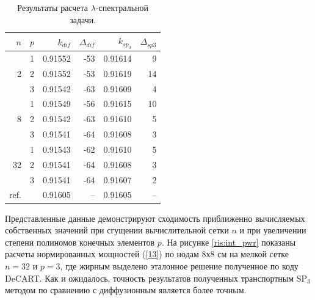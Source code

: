 \documentclass{crm-article}
\begin{document}
\begin{table}[h]
\caption{Результаты расчета $\lambda$-спектральной задачи.}
\label{table:t2-lamda}
\begin{center}
\begin{tabular}{r r r r r r}
\hline
$n$ & $p$ & $k_{dif}$ & $\Delta_{dif}$ & $k_{sp_3}$ & $\Delta_{sp3}$\\
\hline
	& 1	& 0.91552 & -53& 0.91614 & 9 \\
2	& 2	& 0.91552 & -53& 0.91619 &14 \\
	& 3	& 0.91542 & -63& 0.91609 & 4 \\ 
\hline
	& 1	& 0.91549 & -56& 0.91615 & 10\\
8& 2	& 0.91542 & -63& 0.91610 & 5 \\
	& 3	& 0.91541 & -64& 0.91608 & 3 \\ 
\hline
	& 1	& 0.91543 & -62& 0.91610 & 5 \\
32& 2	& 0.91541 & -64& 0.91608 & 3 \\
	& 3	& 0.91541 & -64& 0.91607 & 2 \\
\hline
ref.&   & 0.91605 & -- & 0.91605 & --\\
\hline
\end{tabular}
\end{center}
\end{table}

Представленные данные демонстрируют сходимость приближенно вычисляемых собственных значений при сгущении вычислительной сетки $n$ и при увеличении степени полиномов конечных элементов $p$.
На рисунке \ref{ris:int_pwr} показаны расчеты нормированных мощностей (\ref{13}) по нодам 8х8 см на мелкой сетке $n=32$ и $p=3$, где жирным выделено эталонное решение полученное по коду DeCART.
Как и ожидалось, точность результатов полученных транспортным SP$_3$ методом по сравнению с диффузионным является более точным. 
\end{document}

